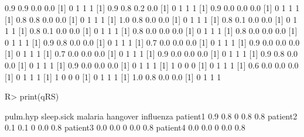 \begin{Schunk}
% --begin: "comp.quant.atleast"
\begin{Soutput}
[1] 0.9 0.9 0.0 0.0
[1] 0 1 1 1
[1] 0.9 0.8 0.2 0.0
[1] 0 1 1 1
[1] 0.9 0.0 0.0 0.0
[1] 0 1 1 1
[1] 0.8 0.8 0.0 0.0
[1] 0 1 1 1
[1] 1.0 0.8 0.0 0.0
[1] 0 1 1 1
[1] 0.8 0.1 0.0 0.0
[1] 0 1 1 1
[1] 0.8 0.1 0.0 0.0
[1] 0 1 1 1
[1] 0.8 0.0 0.0 0.0
[1] 0 1 1 1
[1] 0.8 0.0 0.0 0.0
[1] 0 1 1 1
[1] 0.9 0.8 0.0 0.0
[1] 0 1 1 1
[1] 0.7 0.0 0.0 0.0
[1] 0 1 1 1
[1] 0.9 0.0 0.0 0.0
[1] 0 1 1 1
[1] 0.7 0.0 0.0 0.0
[1] 0 1 1 1
[1] 0.9 0.0 0.0 0.0
[1] 0 1 1 1
[1] 0.9 0.8 0.0 0.0
[1] 0 1 1 1
[1] 0.9 0.0 0.0 0.0
[1] 0 1 1 1
[1] 1 0 0 0
[1] 0 1 1 1
[1] 0.6 0.0 0.0 0.0
[1] 0 1 1 1
[1] 1 0 0 0
[1] 0 1 1 1
[1] 1.0 0.8 0.0 0.0
[1] 0 1 1 1
\end{Soutput}
\begin{Sinput}
R> print(qRS)
\end{Sinput}
\begin{Soutput}
         pulm.hyp sleep.sick malaria hangover influenza
patient1      0.9        0.8       0      0.8       0.8
patient2      0.1        0.1       0      0.0       0.8
patient3      0.0        0.0       0      0.0       0.8
patient4      0.0        0.0       0      0.0       0.8
\end{Soutput}
%
% --end: "comp.quant.atleast"
\end{Schunk}
